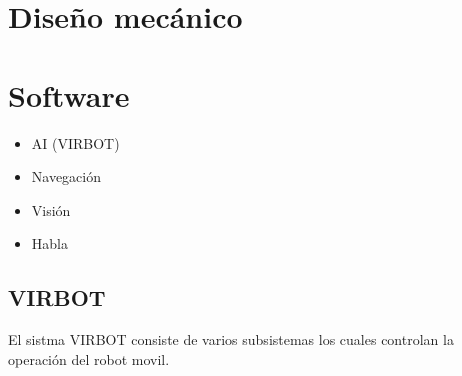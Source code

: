 \documentclass[a4paper]{book}
\begin{document}
\chapter{Diseño mecánico}


\chapter{Software}

\begin{itemize}
	\item{AI (VIRBOT)}

	\item{Navegación}
	
	\item{Visión}
	
	\item{Habla}
\end{itemize}

\section{VIRBOT}

El sistma VIRBOT consiste de varios subsistemas los cuales controlan la operación del robot movil.
\end{document}
